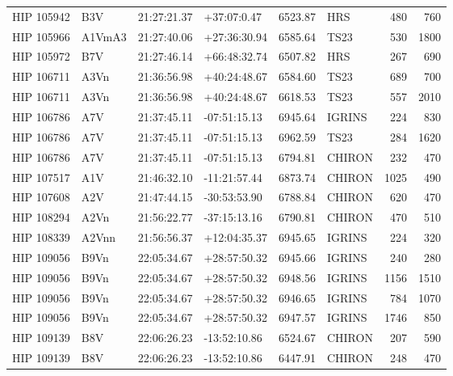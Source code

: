 \documentclass{emulateapj}
\begin{document}
\begin{longtable*}{|l|lllrlrr|}
  HIP 105942 &            B3V &    21:27:21.37 &    +37:07:0.47 &  6523.87 &        HRS &      480 &     760 \\
  HIP 105966 &         A1VmA3 &    21:27:40.06 &   +27:36:30.94 &  6585.64 &       TS23 &      530 &    1800 \\
  HIP 105972 &            B7V &    21:27:46.14 &   +66:48:32.74 &  6507.82 &        HRS &      267 &     690 \\
  HIP 106711 &           A3Vn &    21:36:56.98 &   +40:24:48.67 &  6584.60 &       TS23 &      689 &     700 \\
  HIP 106711 &           A3Vn &    21:36:56.98 &   +40:24:48.67 &  6618.53 &       TS23 &      557 &    2010 \\
  HIP 106786 &            A7V &    21:37:45.11 &   -07:51:15.13 &  6945.64 &     IGRINS &      224 &     830 \\
  HIP 106786 &            A7V &    21:37:45.11 &   -07:51:15.13 &  6962.59 &       TS23 &      284 &    1620 \\
  HIP 106786 &            A7V &    21:37:45.11 &   -07:51:15.13 &  6794.81 &     CHIRON &      232 &     470 \\
  HIP 107517 &            A1V &    21:46:32.10 &   -11:21:57.44 &  6873.74 &     CHIRON &     1025 &     490 \\
  HIP 107608 &            A2V &    21:47:44.15 &   -30:53:53.90 &  6788.84 &     CHIRON &      620 &     470 \\
  HIP 108294 &           A2Vn &    21:56:22.77 &   -37:15:13.16 &  6790.81 &     CHIRON &      470 &     510 \\
  HIP 108339 &          A2Vnn &    21:56:56.37 &   +12:04:35.37 &  6945.65 &     IGRINS &      224 &     320 \\
  HIP 109056 &           B9Vn &    22:05:34.67 &   +28:57:50.32 &  6945.66 &     IGRINS &      240 &     280 \\
  HIP 109056 &           B9Vn &    22:05:34.67 &   +28:57:50.32 &  6948.56 &     IGRINS &     1156 &    1510 \\
  HIP 109056 &           B9Vn &    22:05:34.67 &   +28:57:50.32 &  6946.65 &     IGRINS &      784 &    1070 \\
  HIP 109056 &           B9Vn &    22:05:34.67 &   +28:57:50.32 &  6947.57 &     IGRINS &     1746 &     850 \\
  HIP 109139 &            B8V &    22:06:26.23 &   -13:52:10.86 &  6524.67 &     CHIRON &      207 &     590 \\
  HIP 109139 &            B8V &    22:06:26.23 &   -13:52:10.86 &  6447.91 &     CHIRON &      248 &     470 \\

\end{longtable*}
\end{document}
